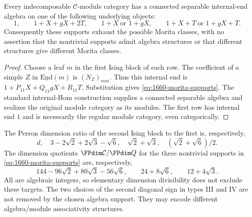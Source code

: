 \begin{corollary}
Every indecomposable $\mathcal C$-module category has a connected separable
internal-end algebra on one of the following underlying objects:
\begin{equation}
1,\qquad 1+X+gX+2T,\qquad 1+X\ \text{or }1+gX,
\qquad 1+X+T\ \text{or }1+gX+T. \label{eq:1660-morita-supports}
\end{equation}
Consequently these supports exhaust the possible Morita classes, with
no assertion that the nontrivial supports admit algebra structures or
that different structures give different Morita classes.
\end{corollary}
\begin{proof}
Choose a leaf $m$ in the first Ising block of each row. The coefficient
of a simple $Z$ in $\underline{\mathrm{End}}(m)$ is $(N_Z)_{mm}$.
Thus this internal end is
$1+P_{11}X+Q_{11}gX+R_{11}T$. Substitution gives \eqref{eq:1660-morita-supports}.
The standard internal-Hom construction supplies a connected separable
algebra and realizes the original module category as its modules.
The first row has internal end $1$ and is necessarily the regular
module category, even categorically.
\end{proof}

The Perron dimension ratio of the second Ising block to the first is,
respectively,
\[
d,\quad 3-2\sqrt2+2\sqrt3-\sqrt6,\quad
\sqrt2+\sqrt3,\quad(\sqrt2+\sqrt6)/2.
\]
The dimension quotients $\FPdim\mathcal C/\FPdim Q$ for the three nontrivial
supports in \eqref{eq:1660-morita-supports} are, respectively,
\[
144-96\sqrt2+80\sqrt3-56\sqrt6,
\qquad24+8\sqrt6,\qquad12+4\sqrt3.
\]
All are algebraic integers, so elementary dimension divisibility does
not exclude these targets. The two choices of the second diagonal sign
in types III and IV are not removed by the chosen algebra support.
They may encode different algebra/module associativity structures.

